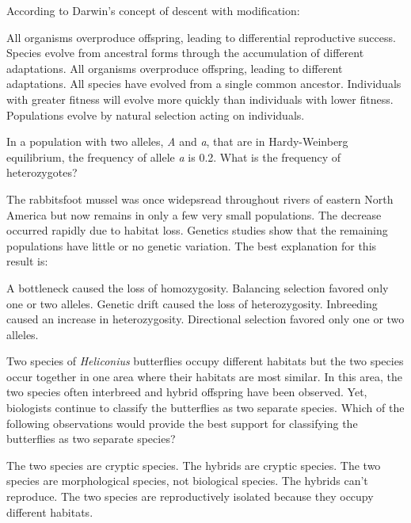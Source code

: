 \question
According to Darwin's concept of descent with modification:

\begin{choices}
\choice All organisms overproduce offspring, leading to differential reproductive success. 
\correctchoice Species evolve from ancestral forms through the accumulation of different adaptations. 
\choice All organisms overproduce offspring, leading to different adaptations. 
\choice All species have evolved from a single common ancestor. 
\choice Individuals with greater fitness will evolve more quickly than individuals with lower fitness. 
\choice Populations evolve by natural selection acting on individuals. 
\end{choices}

\question
In a population with two alleles, \textit{A} and \textit{a}, that are in Hardy-Weinberg equilibrium, the frequency of allele \textit{a} is 0.2. What is the frequency of heterozygotes? 

\begin{choices}
\end{choices}

\question
The rabbitsfoot mussel was once widepsread throughout rivers of eastern North America but now remains in only a few very small populations. The decrease occurred rapidly due to habitat loss. Genetics studies show that the remaining populations have little or no genetic variation. The best explanation for this result is:

\begin{choices}
\choice A bottleneck caused the loss of homozygosity. 
\choice Balancing selection favored only one or two alleles. 
\correctchoice Genetic drift caused the loss of heterozygosity. 
\choice Inbreeding caused an increase in heterozygosity. 
\choice Directional selection favored only one or two alleles. 
\end{choices}

\question
Two species of \textit{Heliconius} butterflies occupy different habitats but the two species occur together in one area where their habitats are most similar. In this area, the two species often interbreed and hybrid offspring have been observed.  Yet, biologists continue to classify the butterflies as two separate species.  Which of the following observations would provide the best support for classifying the butterflies as two separate species? 

\begin{choices}
\choice The two species are cryptic species.
\choice The hybrids are cryptic species.
\choice The two species are morphological species, not biological species.
\correctchoice The hybrids can't reproduce.
\choice The two species are reproductively isolated because they occupy different habitats.
\end{choices}

